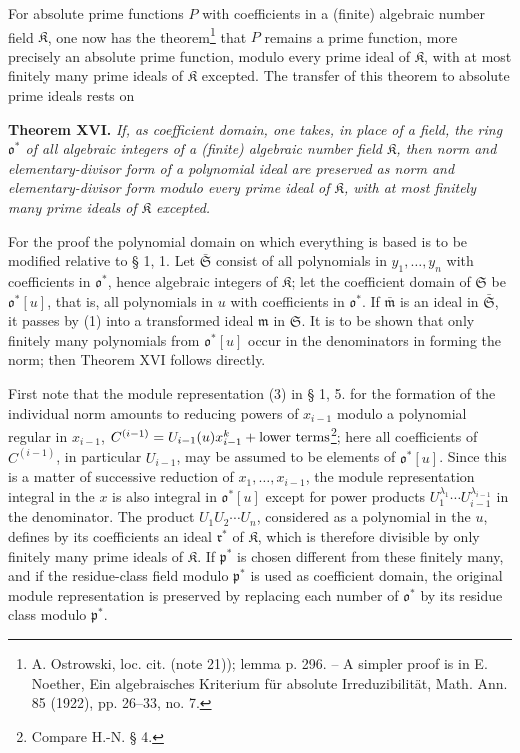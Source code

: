 \documentclass[11pt]{article}
\providecommand{\frakS}{\mathfrak S}
\providecommand{\frakm}{\mathfrak m}
\providecommand{\frakp}{\mathfrak p}
\providecommand{\frakp}{\mathfrak p}
\providecommand{\frakp}{\mathfrak p}
\providecommand{\frakS}{\mathfrak S}
\begin{document}
For absolute prime functions $P$ with coefficients in a (finite) algebraic number field $\mathfrak K$, one now has the theorem\footnote{A. Ostrowski, loc. cit. (note 21)); lemma p. 296. -- A simpler proof is in E. Noether, Ein algebraisches Kriterium für absolute Irreduzibilität, Math. Ann. 85 (1922), pp. 26--33, no. 7.} that $P$ remains a prime function, more precisely an absolute prime function, modulo every prime ideal of $\mathfrak K$, with at most finitely many prime ideals of $\mathfrak K$ excepted. The transfer of this theorem to absolute prime ideals rests on

\textbf{Theorem XVI.} \emph{If, as coefficient domain, one takes, in place of a field, the ring $\mathfrak o^*$ of all algebraic integers of a (finite) algebraic number field $\mathfrak K$, then norm and elementary-divisor form of a polynomial ideal are preserved as norm and elementary-divisor form modulo every prime ideal of $\mathfrak K$, with at most finitely many prime ideals of $\mathfrak K$ excepted.}

For the proof the polynomial domain on which everything is based is to be modified relative to § 1, 1. Let $\bar{\frakS}$ consist of all polynomials in $y_1,\ldots,y_n$ with coefficients in $\mathfrak o^*$, hence algebraic integers of $\mathfrak K$; let the coefficient domain of $\frakS$ be $\mathfrak o^*[u]$, that is, all polynomials in $u$ with coefficients in $\mathfrak o^*$. If $\bar{\frakm}$ is an ideal in $\bar{\frakS}$, it passes by (1) into a transformed ideal $\frakm$ in $\frakS$. It is to be shown that only finitely many polynomials from $\mathfrak o^*[u]$ occur in the denominators in forming the norm; then Theorem XVI follows directly.

First note that the module representation (3) in § 1, 5. for the formation of the individual norm amounts to reducing powers of $x_{i-1}$ modulo a polynomial regular in $x_{i-1}$, $C^{(i-1)}=U_{i-1}(u)x_{i-1}^{k}+\hbox{lower terms}$\footnote{Compare H.-N. § 4.}; here all coefficients of $C^{(i-1)}$, in particular $U_{i-1}$, may be assumed to be elements of $\mathfrak o^*[u]$. Since this is a matter of successive reduction of $x_1,\ldots,x_{i-1}$, the module representation integral in the $x$ is also integral in $\mathfrak o^*[u]$ except for power products $U_1^{\lambda_1}\cdots U_{i-1}^{\lambda_{i-1}}$ in the denominator. The product $U_1U_2\cdots U_n$, considered as a polynomial in the $u$, defines by its coefficients an ideal $\mathfrak r^*$ of $\mathfrak K$, which is therefore divisible by only finitely many prime ideals of $\mathfrak K$. If $\frakp^*$ is chosen different from these finitely many, and if the residue-class field modulo $\frakp^*$ is used as coefficient domain, the original module representation is preserved by replacing each number of $\mathfrak o^*$ by its residue class modulo $\frakp^*$.
\end{document}
